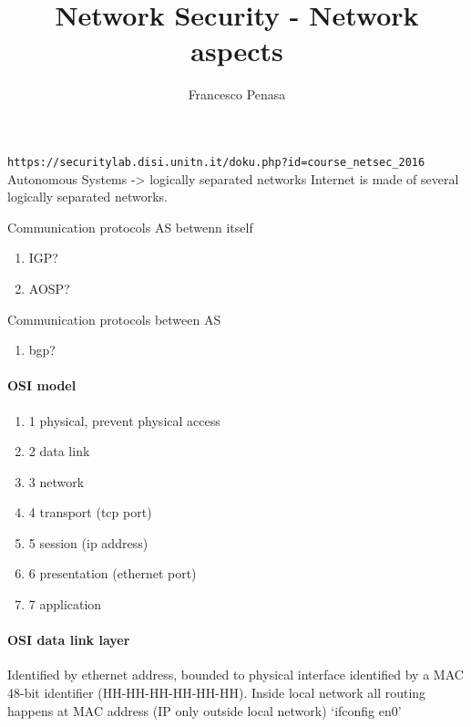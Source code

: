 \documentclass[11pt]{article}
\begin{document}
\author{Francesco Penasa}
\title{Network Security - Network aspects}
\maketitle

\medskip

\texttt{https://securitylab.disi.unitn.it/doku.php?id=course_netsec_2016}\\

Autonomous Systems -> logically separated networks
Internet is made of several logically separated networks.

Communication protocols AS betwenn itself
\begin{enumerate}
	\item IGP?
	\item AOSP?
\end{enumerate}

Communication protocols between AS
\begin{enumerate}
	\item bgp?
\end{enumerate}

\paragraph{OSI model} %
\label{par:osi_model}
\begin{enumerate}
	\item 1 physical, prevent physical access
	\item 2 data link
	\item 3 network 
	\item 4 transport (tcp port)
	\item 5 session (ip address)
	\item 6 presentation (ethernet port)
	\item 7 application
\end{enumerate}

\paragraph{OSI data link layer} %
\label{par:osi_data_link_layer}
Identified by ethernet address, bounded to physical interface identified by a MAC
48-bit identifier (HH-HH-HH-HH-HH-HH).
Inside local network all routing happens at MAC address (IP only outside local network)
`ifconfig en0'
\end{document}

